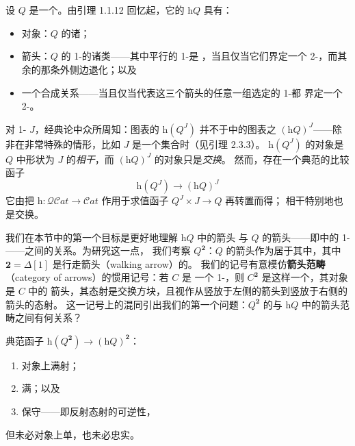 \providecommand{\qcOne}{\mathbf{1}}   %
\providecommand{\qcTwo}{\mathbf{2}}   %
\providecommand{\qcInt}{\mathbb{I}}   %
\providecommand{\Cat}{\mathcal{C}at}
\providecommand{\QCat}{\mathcal{Q}\mathcal{C}at}

\section{\trSmotheringFunctor}\label{sec:smothering-functors}

设 $Q$ 是一个\trQuasiCategory{}。由引理 1.1.12 回忆起，它的\trHomotopyCategory{}%
$\mathrm{h}Q$ 具有：
\begin{itemize}
\item 对象：$Q$ 的诸\trElement{}；
\item 箭头：$Q$ 的 1-\trSimplex{}的诸\trHomotopy{}类——其中平行的 1-\trSimplex{}是%
\trHomotopic{}，当且仅当它们界定一个 2-\trSimplex{}，而其余的那条外侧边退化；以及
\item 一个合成关系——当且仅当代表这三个箭头的任意一组选定的 1-\trSimplex{}都%
界定一个 2-\trSimplex{}。
\end{itemize}
对 1-\trCategory{} $J$，经典\trHomotopy{}论中众所周知：图表的\trHomotopyCategory{}%
$\mathrm{h}(Q^J)$ 并不\trEquivalence{}于\trHomotopyCategory{}中的图表之\trCategory{}%
$(\mathrm{h}Q)^J$——除非在非常特殊的情形，比如 $J$ 是一个集合时（见引理 2.3.3）。
$\mathrm{h}(Q^J)$ 的对象是 $Q$ 中形状为 $J$ 的\emph{\trHomotopy{}相干\trDiagram}，而%
$(\mathrm{h}Q)^J$ 的对象只是\emph{\trHomotopy{}交换\trDiagram}。%
然而，存在一个典范的比较函子
\[
\mathrm{h}(Q^J)\longrightarrow(\mathrm{h}Q)^J
\]
它由把 $\mathrm{h}\colon\QCat\to\Cat$ 作用于求值函子 $Q^J\times J\to Q$ 再转置而得；
\trHomotopy{}相干\trDiagram{}特别地也是\trHomotopy{}交换\trDiagram{}。

我们在本节中的第一个目标是更好地理解\trHomotopyCategory{} $\mathrm{h}Q$ 中的箭头%
与 $Q$ 的箭头——即\trQuasiCategory{}中的 1-\trSimplex{}——之间的关系。为研究这一点，
我们考察\trQuasiCategory{} $Q^{\qcTwo}$：$Q$ 的箭头作为\trElement{}居于其中，其中%
$\qcTwo=\Delta[1]$ 是行走箭头（walking arrow）的\trNerve{}。%
我们的记号有意模仿\textbf{箭头范畴}（category of arrows）的惯用记号：若 $C$ 是%
一个 1-\trCategory{}，则 $C^{\qcTwo}$ 是这样一个\trCategory{}，其对象是 $C$ 中的%
箭头，其态射是交换方块，且视作从竖放于左侧的箭头到竖放于右侧的箭头的态射。%
这一记号上的混同引出我们的第一个问题：$Q^{\qcTwo}$ 的\trHomotopyCategory{}与%
\trHomotopyCategory{} $\mathrm{h}Q$ 中的箭头范畴之间有何关系？

\begin{lemma}\label{lem:canonical-q2}
典范函子 $\mathrm{h}(Q^{\qcTwo})\to(\mathrm{h}Q)^{\qcTwo}$：
\begin{enumerate}[label=(\roman*)]
\item 对象上满射；
\item 满；以及
\item 保守——即反射态射的可逆性，%
\end{enumerate}
但未必对象上单，也未必忠实。
\end{lemma}

